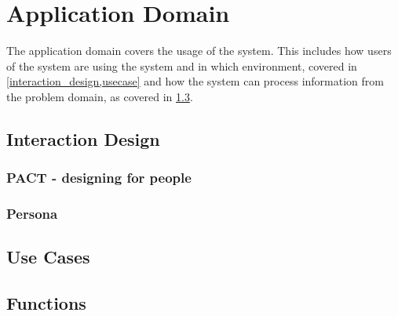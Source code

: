 \chapter{Application Domain}
The application domain covers the usage of the system. This includes
how users of the system are using the system and in which environment,
covered in \cref{interaction_design,usecase} and how the system can process
information from the problem domain, as covered in \cref{functions}.


\section{Interaction Design}\label{interaction_design}
\subsection{PACT - designing for people}\label{pact}


\subsection{Persona}


\section{Use Cases}\label{usecase}


\section{Functions}\label{functions}

